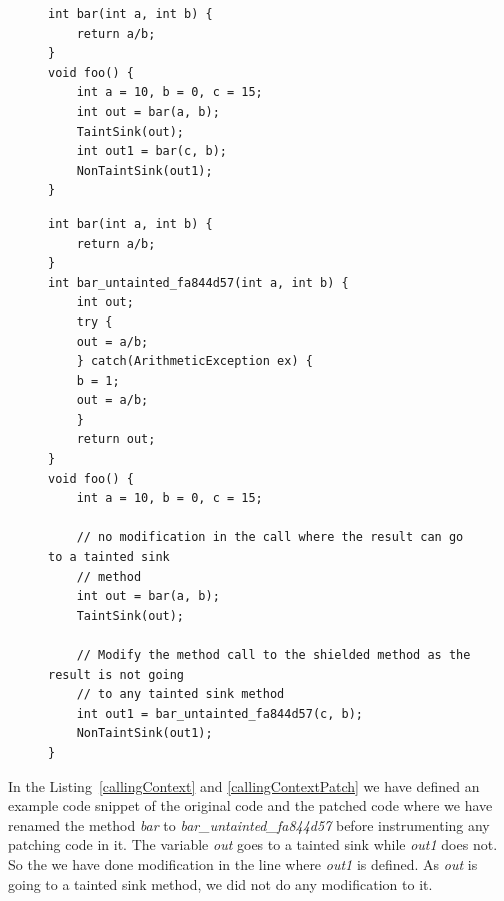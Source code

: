 \lstset{language=java, caption = Same method calling in different scenario,
label=callingContext}
\begin{figure}[t]
\begin{lstlisting}[countblanklines=false]
int bar(int a, int b) {
    return a/b;
}
void foo() {
    int a = 10, b = 0, c = 15;
    int out = bar(a, b);
    TaintSink(out);
    int out1 = bar(c, b);
    NonTaintSink(out1);
}
\end{lstlisting}
\end{figure}

\lstset{language=java, caption = Method name modification for different calling
context, label=callingContextPatch}
\begin{figure}[t]
\begin{lstlisting}[countblanklines=false]
int bar(int a, int b) {
    return a/b;
}
int bar_untainted_fa844d57(int a, int b) {
    int out;
    try {
	out = a/b;
    } catch(ArithmeticException ex) {
	b = 1;
	out = a/b;
    }
    return out;
}
void foo() {
    int a = 10, b = 0, c = 15;

    // no modification in the call where the result can go to a tainted sink
    // method
    int out = bar(a, b);
    TaintSink(out);

    // Modify the method call to the shielded method as the result is not going
    // to any tainted sink method
    int out1 = bar_untainted_fa844d57(c, b);
    NonTaintSink(out1);
}
\end{lstlisting}
\end{figure}

In the Listing~\ref{callingContext} and \ref{callingContextPatch} we have
defined an example code snippet of the original code and the patched code where
we have renamed the method \emph{bar} to \emph{bar\_untainted\_fa844d57}
before instrumenting any patching code in it. The variable \emph{out} goes to a
tainted sink while \emph{out1} does not. So the we have done modification in the
line where \emph{out1} is defined. As \emph{out} is going to a tainted sink
method, we did not do any modification to it.



